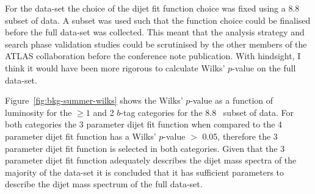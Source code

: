 For the \summer{} data-set the choice of the dijet fit function choice was fixed using a 8.8~\ifb{} subset of data.
A subset was used such that the function choice could be finalised before the full data-set was collected.
This meant that the analysis strategy and search phase validation studies could be scrutinised by the other members of the ATLAS collaboration before the conference note publication.
With hindsight, I think it would have been more rigorous to calculate Wilks' \mbox{$p$-value} on the full data-set.

Figure~\ref{fig:bkg-summer-wilks} shows the Wilks' \mbox{$p$-value} as a function of luminosity
for the $\geq1$ and 2 \mbox{$b$-tag} categories for the 8.8~\ifb{} subset of data.
For both categories the 3 parameter dijet fit function when compared to the 4 parameter dijet fit function
has a Wilks' \mbox{$p$-value} $>$ 0.05,
therefore the 3 parameter dijet fit function is selected in both categories.
Given that the 3 parameter dijet fit function adequately describes the dijet mass spectra of the
majority of the data-set it is concluded that it has sufficient parameters to describe the dijet mass spectrum of the full data-set.

\vfill
\newpage

